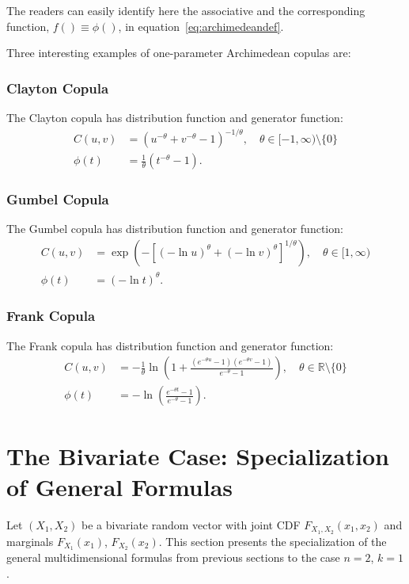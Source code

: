The readers can easily identify here the associative and the corresponding function, $f() \equiv \phi()$, in equation~\eqref{eq:archimedeandef}.

Three interesting examples of one-parameter Archimedean copulas are:
\subsubsection*{Clayton Copula}
The Clayton copula has distribution function and generator function:
\begin{align}
C(u, v) &= (u^{-\theta} + v^{-\theta} - 1)^{-1/\theta}, \quad \theta \in [-1,\infty) \setminus \{0\} \\
\phi(t) &= \frac{1}{\theta}(t^{-\theta} - 1).
\end{align}
\subsubsection*{Gumbel Copula}
The Gumbel copula has distribution function and generator function:
\begin{align}
C(u, v) &= \exp\left(-\left[(-\ln u)^\theta + (-\ln v)^\theta\right]^{1/\theta}\right), \quad \theta \in [1,\infty) \\
\phi(t) &= (-\ln t)^\theta.
\end{align}
\subsubsection*{Frank Copula}\label{FrankCopula}
The Frank copula has distribution function and generator function:
\begin{align}
C(u, v) &= -\frac{1}{\theta} \ln\left(1 + \frac{(e^{-\theta u} - 1)(e^{-\theta v} - 1)}{e^{-\theta} - 1}\right), \quad \theta \in \mathbb{R} \setminus \{0\} \\
\phi(t) &= -\ln\left(\frac{e^{-\theta t} - 1}{e^{-\theta} - 1}\right).
\end{align}
\section{The Bivariate Case: Specialization of General Formulas}\label{sec:bivariate}
Let $(X_1,X_2)$ be a bivariate random vector with joint CDF $F_{X_1,X_2}(x_1,x_2)$ and marginals $F_{X_1}(x_1)$, $F_{X_2}(x_2)$. This section presents the specialization of the general multidimensional formulas from previous sections to the case $n=2$, $k=1$.

